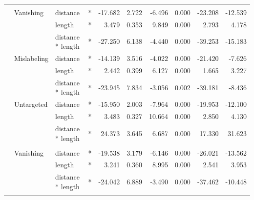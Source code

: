 \documentclass[
]{article}
\begin{document}
\begin{longtable}[t]{llllrrrrrr}
\cmidrule{1-10}\pagebreak[0]
\addlinespace[0.3em]
\multicolumn{10}{l}{\textbf{RetinaNet}}\\
\hspace{1em} & Vanishing & distance & * & -17.682 & 2.722 & -6.496 & 0.000 & -23.208 & -12.539\\
\cmidrule{3-10}\nopagebreak
\hspace{1em} &  & length & * & 3.479 & 0.353 & 9.849 & 0.000 & 2.793 & 4.178\\
\cmidrule{3-10}\nopagebreak
\hspace{1em} &  & distance * length & * & -27.250 & 6.138 & -4.440 & 0.000 & -39.253 & -15.183\\
\cmidrule{2-10}\nopagebreak
\hspace{1em} & Mislabeling & distance & * & -14.139 & 3.516 & -4.022 & 0.000 & -21.420 & -7.626\\
\cmidrule{3-10}\nopagebreak
\hspace{1em} &  & length & * & 2.442 & 0.399 & 6.127 & 0.000 & 1.665 & 3.227\\
\cmidrule{3-10}\nopagebreak
\hspace{1em} &  & distance * length & * & -23.945 & 7.834 & -3.056 & 0.002 & -39.181 & -8.436\\
\cmidrule{2-10}\nopagebreak
\hspace{1em} & Untargeted & distance & * & -15.950 & 2.003 & -7.964 & 0.000 & -19.953 & -12.100\\
\cmidrule{3-10}\nopagebreak
\hspace{1em} &  & length & * & 3.483 & 0.327 & 10.664 & 0.000 & 2.850 & 4.130\\
\cmidrule{3-10}\nopagebreak
\hspace{1em} &  & distance * length & * & 24.373 & 3.645 & 6.687 & 0.000 & 17.330 & 31.623\\
\cmidrule{1-10}\pagebreak[0]
\addlinespace[0.3em]
\multicolumn{10}{l}{\textbf{Faster R-CNN}}\\
\hspace{1em} & Vanishing & distance & * & -19.538 & 3.179 & -6.146 & 0.000 & -26.021 & -13.562\\
\cmidrule{3-10}\nopagebreak
\hspace{1em} &  & length & * & 3.241 & 0.360 & 8.995 & 0.000 & 2.541 & 3.953\\
\cmidrule{3-10}\nopagebreak
\hspace{1em} &  & distance * length & * & -24.042 & 6.889 & -3.490 & 0.000 & -37.462 & -10.448\\
\cmidrule{2-10}\nopagebreak

\end{longtable}
\end{document}
